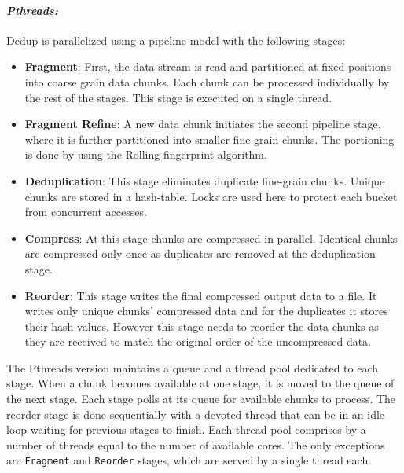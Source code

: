 {\paragraph{\textit{Pthreads:}}
Dedup is parallelized using a pipeline model with the following stages:
\begin{itemize}
  \item \textbf{Fragment}:  First, the data-stream is read and partitioned at fixed positions into coarse grain data chunks. Each chunk can be processed individually by the rest of the stages. This stage is executed on a single thread.
  \item \textbf{Fragment Refine}:  A new data chunk initiates the second pipeline stage, where it is further partitioned into smaller fine-grain
	chunks.  The portioning is done by using the Rolling-fingerprint algorithm.  
  \item \textbf{Deduplication}:  This stage eliminates duplicate fine-grain chunks.  Unique chunks are stored in a hash-table.
	Locks are used here to protect	each bucket from concurrent accesses.
  \item \textbf{Compress}:  At this stage chunks are compressed in parallel.  Identical chunks are compressed only once as duplicates are removed 
	at the deduplication stage.
  \item \textbf{Reorder}:  This stage writes the final compressed output data to a file.  It writes only unique chunks' compressed data and for the
	duplicates it stores their hash values.  However this stage needs to reorder the data chunks as they are received
	to match the original order of the uncompressed data.
\end{itemize}

The Pthreads version maintains a queue and a thread pool dedicated to each stage.  When a
chunk becomes available at one stage, it is moved to the queue of the next stage.  Each
stage polls at its queue for available chunks to process. The reorder stage is done
sequentially with a devoted thread that can be in an idle loop waiting for previous stages
to finish.  Each thread pool  comprises by a number of threads equal to the number of
available cores.  The only exceptions are \texttt{Fragment} and \texttt{Reorder} stages,
which are served by a single thread each.


}
